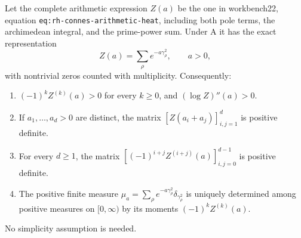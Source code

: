 \begin{theorem}
Let the complete arithmetic expression $Z(a)$ be the one in
workbench22, equation \texttt{eq:rh-connes-arithmetic-heat}, including
both pole terms, the archimedean integral, and the prime-power sum.
Under A it has the exact representation
\[
 Z(a)=\sum_\rho e^{-a\gamma_\rho^2},\qquad a>0,
\]
with nontrivial zeros counted with multiplicity. Consequently:
\begin{enumerate}
\item $(-1)^kZ^{(k)}(a)>0$ for every $k\ge0$, and
$(\log Z)''(a)>0$.
\item If $a_1,\ldots,a_d>0$ are distinct, the matrix
$[Z(a_i+a_j)]_{i,j=1}^d$ is positive definite.
\item For every $d\ge1$, the matrix
$[(-1)^{i+j}Z^{(i+j)}(a)]_{i,j=0}^{d-1}$ is positive definite.
\item The positive finite measure
$\mu_a=\sum_\rho e^{-a\gamma_\rho^2}\delta_{\gamma_\rho^2}$
is uniquely determined among positive measures on $[0,\infty)$ by its
moments $(-1)^kZ^{(k)}(a)$.
\end{enumerate}
No simplicity assumption is needed.
\end{theorem}
